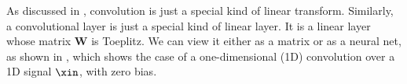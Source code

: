 As discussed in \chap{\ref{chapter:linear_image_filtering}}, convolution is just a special kind of linear transform. Similarly, a convolutional layer is just a special kind of linear layer. It is a linear layer whose matrix $\mathbf{W}$ is Toeplitz. We can view it either as a matrix or as a neural net, as shown in \fig{\ref{fig:convolutional_neural_nets:conv_matrix_vs_net}}, which shows the case of a one-dimensional (1D) convolution over a 1D signal $\xin$, with zero bias.
\begin{figure}[h!]
    \begin{minipage}{0.45\linewidth}
        \centering
\end{minipage}
\end{figure}
